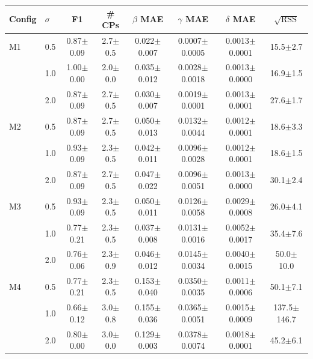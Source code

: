 \begin{tabular}{llcccccc}
\hline
Config & $\sigma$ & F1 & \# CPs & $\beta$ MAE & $\gamma$ MAE & $\delta$ MAE & $\sqrt{\mathrm{RSS}}$ \\
\hline
M1 & 0.5 & 0.87$\pm$0.09 & 2.7$\pm$0.5 & 0.022$\pm$0.007 & 0.0007$\pm$0.0005 & 0.0013$\pm$0.0001 & 15.5$\pm$2.7 \\
 & 1.0 & 1.00$\pm$0.00 & 2.0$\pm$0.0 & 0.035$\pm$0.012 & 0.0028$\pm$0.0018 & 0.0013$\pm$0.0000 & 16.9$\pm$1.5 \\
 & 2.0 & 0.87$\pm$0.09 & 2.7$\pm$0.5 & 0.030$\pm$0.007 & 0.0019$\pm$0.0001 & 0.0013$\pm$0.0001 & 27.6$\pm$1.7 \\
\hline
M2 & 0.5 & 0.87$\pm$0.09 & 2.7$\pm$0.5 & 0.050$\pm$0.013 & 0.0132$\pm$0.0044 & 0.0012$\pm$0.0001 & 18.6$\pm$3.3 \\
 & 1.0 & 0.93$\pm$0.09 & 2.3$\pm$0.5 & 0.042$\pm$0.011 & 0.0096$\pm$0.0028 & 0.0012$\pm$0.0001 & 18.6$\pm$1.5 \\
 & 2.0 & 0.87$\pm$0.09 & 2.7$\pm$0.5 & 0.047$\pm$0.022 & 0.0096$\pm$0.0051 & 0.0013$\pm$0.0000 & 30.1$\pm$2.4 \\
\hline
M3 & 0.5 & 0.93$\pm$0.09 & 2.3$\pm$0.5 & 0.050$\pm$0.011 & 0.0126$\pm$0.0058 & 0.0029$\pm$0.0008 & 26.0$\pm$4.1 \\
 & 1.0 & 0.77$\pm$0.21 & 2.3$\pm$0.5 & 0.037$\pm$0.008 & 0.0131$\pm$0.0016 & 0.0052$\pm$0.0017 & 35.4$\pm$7.6 \\
 & 2.0 & 0.76$\pm$0.06 & 2.3$\pm$0.9 & 0.046$\pm$0.012 & 0.0145$\pm$0.0034 & 0.0040$\pm$0.0015 & 50.0$\pm$10.0 \\
\hline
M4 & 0.5 & 0.77$\pm$0.21 & 2.3$\pm$0.5 & 0.153$\pm$0.040 & 0.0350$\pm$0.0035 & 0.0011$\pm$0.0006 & 50.1$\pm$7.1 \\
 & 1.0 & 0.66$\pm$0.12 & 3.0$\pm$0.8 & 0.155$\pm$0.036 & 0.0365$\pm$0.0051 & 0.0015$\pm$0.0009 & 137.5$\pm$146.7 \\
 & 2.0 & 0.80$\pm$0.00 & 3.0$\pm$0.0 & 0.129$\pm$0.003 & 0.0378$\pm$0.0074 & 0.0018$\pm$0.0001 & 45.2$\pm$6.1 \\
\hline
\end{tabular}